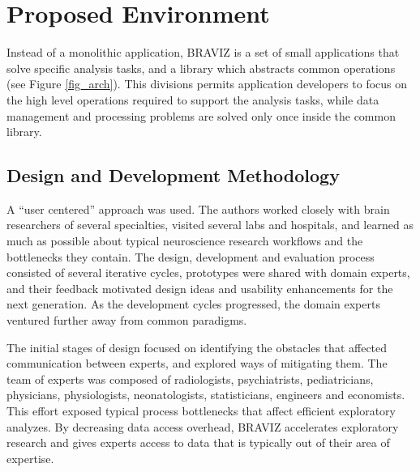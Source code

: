 \documentclass[utf8,paper]{frontiersSCNS} %
\begin{document}
\section{Proposed Environment}


Instead of a monolithic application, BRAVIZ is a set of small applications that solve specific analysis tasks, and a library which abstracts common operations (see Figure \ref{fig_arch}). This divisions permits application developers to focus on the high level operations required to support the analysis tasks, while data management and processing problems are solved only once inside the common library. 

\subsection{Design and Development Methodology}

A ``user centered'' approach\citep{fernandez_user-centered_2013,wassink_applying_2009} was used. The authors worked closely with brain researchers of several specialties, visited several labs and hospitals, and learned as much as possible about typical neuroscience research workflows and the bottlenecks they contain. The design, development and evaluation process consisted of several iterative cycles, prototypes were shared with domain experts, and their feedback motivated design ideas and usability enhancements for the next generation. As the development cycles progressed, the domain experts ventured further away from common paradigms.

The initial stages of design focused on identifying the obstacles that affected communication between experts, and explored ways of mitigating them. The team of experts was composed of radiologists, psychiatrists, pediatricians, physicians, physiologists, neonatologists,  statisticians, engineers and economists. This effort exposed typical process bottlenecks that affect efficient exploratory analyzes. By decreasing data access overhead, BRAVIZ accelerates exploratory research and gives experts access to data that is typically out of their area of expertise.
\end{document}
